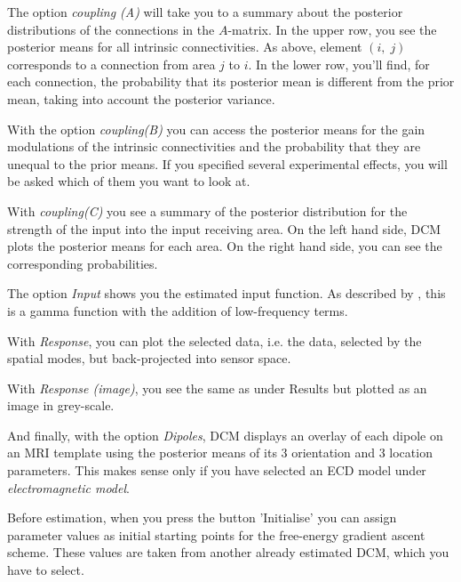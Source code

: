 The option \textit{coupling (A)} will take you to a summary about the
posterior distributions of the connections in the $A$-matrix. In the
upper row, you see the posterior means for all intrinsic
connectivities. As above, element $(i,\; j)$ corresponds to a
connection from area $j$ to $i$. In the lower row, you'll find, for
each connection, the probability that its posterior mean is different
from the prior mean, taking into account the posterior variance.

With the option \textit{coupling(B)} you can access the posterior
means for the gain modulations of the intrinsic connectivities and
the probability that they are unequal to the prior means. If you specified several experimental effects, you will be asked which of them you want to look at.

With \textit{coupling(C)} you see a summary of the posterior
distribution for the strength of the input into the input receiving
area. On the left hand side, DCM plots the posterior means for each
area. On the right hand side, you can see the corresponding
probabilities.


The option \textit{Input} shows you the estimated input function. As
described by \cite{od_dcm_erp}, this is a gamma function with the
addition of low-frequency terms.

With \textit{Response}, you can plot the selected data, i.e. the data,
selected by the spatial modes, but back-projected into sensor space.

With \textit{Response (image)}, you see the same as under Results but
plotted as an image in grey-scale.

And finally, with the option \textit{Dipoles}, DCM displays an
overlay of each dipole on an MRI template using the posterior means of
its 3 orientation and 3 location parameters. This makes sense only if
you have selected an ECD model under \textit{electromagnetic model}.

Before estimation, when you press the button 'Initialise' you can
assign parameter values as initial starting points for the free-energy
gradient ascent scheme. These values are taken from another already
estimated DCM, which you have to select.

